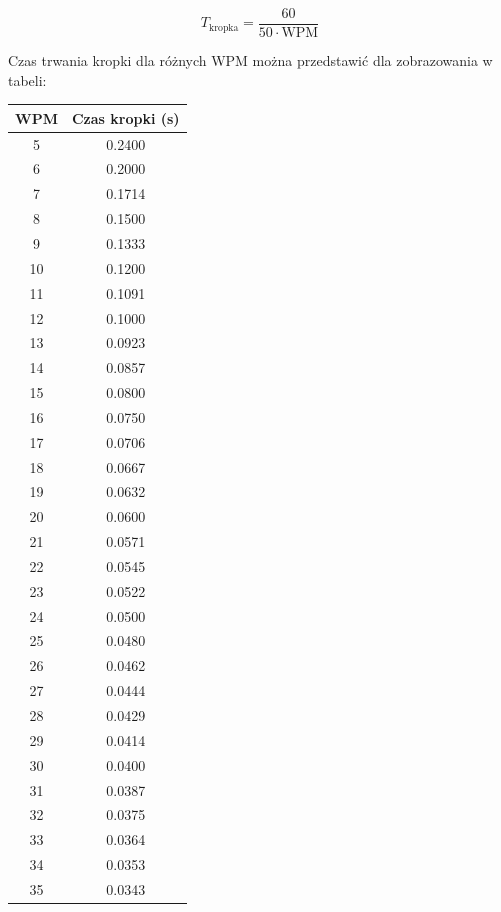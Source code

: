 \begin{equation}
	T_{\text{kropka}} = \frac{60}{50 \cdot \text{WPM}}
\end{equation}

Czas trwania kropki dla różnych WPM można przedstawić dla zobrazowania w tabeli:

\begin{tabular}{|c|c|}
	\hline
	WPM & Czas kropki (s) \\
	\hline
	5 & 0.2400 \\
	\hline
	6 & 0.2000 \\
	\hline
	7 & 0.1714 \\
	\hline
	8 & 0.1500 \\
	\hline
	9 & 0.1333 \\
	\hline
	10 & 0.1200 \\
	\hline
	11 & 0.1091 \\
	\hline
	12 & 0.1000 \\
	\hline
	13 & 0.0923 \\
	\hline
	14 & 0.0857 \\
	\hline
	15 & 0.0800 \\
	\hline
	16 & 0.0750 \\
	\hline
	17 & 0.0706 \\
	\hline
	18 & 0.0667 \\
	\hline
	19 & 0.0632 \\
	\hline
	20 & 0.0600 \\
	\hline
	21 & 0.0571 \\
	\hline
	22 & 0.0545 \\
	\hline
	23 & 0.0522 \\
	\hline
	24 & 0.0500 \\
	\hline
	25 & 0.0480 \\
	\hline
	26 & 0.0462 \\
	\hline
	27 & 0.0444 \\
	\hline
	28 & 0.0429 \\
	\hline
	29 & 0.0414 \\
	\hline
	30 & 0.0400 \\
	\hline
	31 & 0.0387 \\
	\hline
	32 & 0.0375 \\
	\hline
	33 & 0.0364 \\
	\hline
	34 & 0.0353 \\
	\hline
	35 & 0.0343 \\
	\hline
	\hline
\end{tabular}



